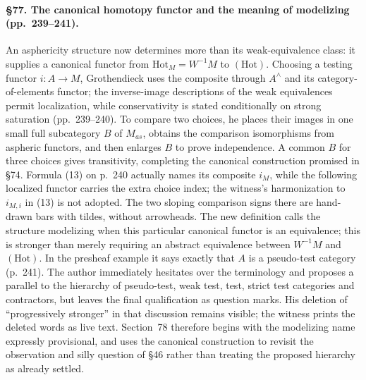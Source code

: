 \paragraph{\S77. The canonical homotopy functor and the meaning of modelizing (pp.\ 239--241).}
An asphericity structure now determines more than its weak-equivalence class: it supplies a canonical functor from $\mathrm{Hot}_M=W^{-1}M$ to $(\mathrm{Hot})$. Choosing a testing functor $i:A\to M$, Grothendieck uses the composite through $A^\wedge$ and its category-of-elements functor; the inverse-image descriptions of the weak equivalences permit localization, while conservativity is stated conditionally on strong saturation (pp.\ 239--240). To compare two choices, he places their images in one small full subcategory $B$ of $M_{as}$, obtains the comparison isomorphisms from aspheric functors, and then enlarges $B$ to prove independence. A common $B$ for three choices gives transitivity, completing the canonical construction promised in \S74. Formula (13) on p.\ 240 actually names its composite $i_M$, while the following localized functor carries the extra choice index; the witness's harmonization to $i_{M,i}$ in (13) is not adopted. The two sloping comparison signs there are hand-drawn bars with tildes, without arrowheads. The new definition calls the structure modelizing when this particular canonical functor is an equivalence; this is stronger than merely requiring an abstract equivalence between $W^{-1}M$ and $(\mathrm{Hot})$. In the presheaf example it says exactly that $A$ is a pseudo-test category (p.\ 241). The author immediately hesitates over the terminology and proposes a parallel to the hierarchy of pseudo-test, weak test, test, strict test categories and contractors, but leaves the final qualification as question marks. His deletion of “progressively stronger” in that discussion remains visible; the witness prints the deleted words as live text. Section~78 therefore begins with the modelizing name expressly provisional, and uses the canonical construction to revisit the observation and silly question of \S46 rather than treating the proposed hierarchy as already settled.


